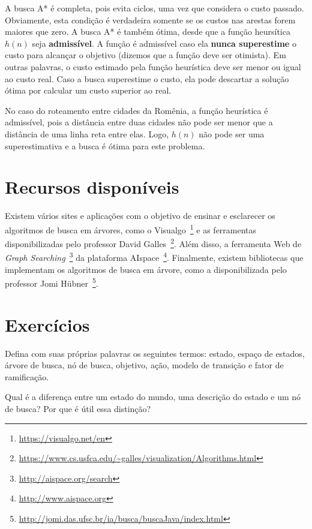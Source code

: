 A busca A* é completa, pois evita ciclos, uma vez que considera o custo passado. Obviamente, esta condição é verdadeira somente se os custos nas arestas forem maiores que zero. A busca A* é também ótima, desde que a função heursítica $h(n)$ seja \textbf{admissível}. A função é admissível caso ela \textbf{nunca superestime} o custo para alcançar o objetivo (dizemos que a função deve ser otimista). Em outras palavras, o custo estimado pela função heurística deve ser menor ou igual ao custo real. Caso a busca superestime o custo, ela pode descartar a solução ótima por calcular um custo superior ao real.

No caso do roteamento entre cidades da Romênia, a função heurística é admissível, pois a distância entre duas cidades não pode ser menor que a distância de uma linha reta entre elas. Logo, $h(n)$ não pode ser uma superestimativa e a busca é ótima para este problema.

\section{Recursos disponíveis}

Existem vários sites e aplicações com o objetivo de ensinar e esclarecer os algoritmos de busca em árvores, como o Visualgo~\footnote{\url{https://visualgo.net/en}} e as ferramentas disponibilizadas pelo professor David Galles~\footnote{\url{https://www.cs.usfca.edu/~galles/visualization/Algorithms.html}}. Além disso, a ferramenta Web de \textit{Graph Searching}~\footnote{\url{http://aispace.org/search}} da plataforma AIspace~\footnote{\url{http://www.aispace.org}}. Finalmente, existem bibliotecas que implementam os algoritmos de busca em árvore, como a disponibilizada pelo professor Jomi Hübner~\footnote{\url{http://jomi.das.ufsc.br/ia/busca/buscaJava/index.html}}.

\clearpage

\section{Exercícios}

\resetexercisenumbering

\begin{exercise}
Defina com suas próprias palavras os seguintes termos: estado, espaço de estados, árvore de busca, nó de busca, objetivo, ação, modelo de transição e fator de ramificação.
\end{exercise}

\begin{exercise}
Qual é a diferença entre um estado do mundo, uma descrição do estado e um nó de busca? Por que é útil essa distinção?
\end{exercise}

